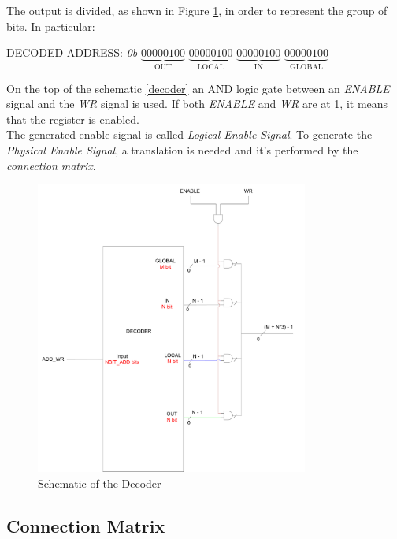 The output is divided, as shown in Figure \ref{decoder}, in order to represent the group of bits. In particular: 

\begin{center}
	DECODED ADDRESS: \emph{0b} $\underbrace{00000100}_{\text{OUT}}$ $\underbrace{00000100}_{\text{LOCAL}}$ $\underbrace{00000100}_{\text{IN}}$ $\underbrace{00000100}_{\text{GLOBAL}}$
\end{center}

On the top of the schematic \autoref{decoder} an AND logic gate between an \emph{ENABLE} signal and the \emph{WR} signal is used. If both \emph{ENABLE} and \emph{WR} are at 1, it means that the register is enabled.\\

The generated enable signal is called \emph{Logical Enable Signal}. To generate the \emph{Physical Enable Signal}, a translation is needed and it's performed by the \emph{connection matrix}.

\begin{figure}[H]
    \centering
    \includegraphics[width=0.8\textwidth]{chapters/4_DecodeStage/images/Decoder.pdf}
    \caption{Schematic of the Decoder}
    \label{decoder}
\end{figure}

\subsection{Connection Matrix}

